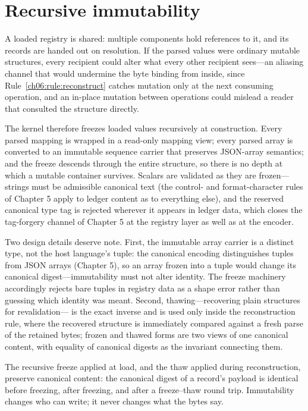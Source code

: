 \section{Recursive immutability}\label{ch06:immutability}

A loaded registry is shared: multiple components hold references to it,
and its records are handed out on resolution. If the parsed values were
ordinary mutable structures, every recipient could alter what every other
recipient sees---an aliasing channel that would undermine the byte
binding from inside, since Rule~\ref{ch06:rule:reconstruct} catches
mutation only at the next consuming operation, and an in-place mutation
between operations could mislead a reader that consulted the structure
directly.

The kernel therefore freezes loaded values recursively at construction.
Every parsed mapping is wrapped in a read-only mapping view; every parsed
array is converted to an immutable sequence carrier that preserves
JSON-array semantics; and the freeze descends through the entire
structure, so there is no depth at which a mutable container survives.
Scalars are validated as they are frozen---strings must be admissible
canonical text (the control- and format-character rules of Chapter 5
apply to ledger content as to everything else), and the reserved
canonical type tag is rejected wherever it appears in ledger data, which
closes the tag-forgery channel of Chapter 5 at the registry layer as well
as at the encoder.

Two design details deserve note. First, the immutable array carrier is a
distinct type, not the host language's tuple: the canonical encoding
distinguishes tuples from JSON arrays (Chapter 5), so an array frozen
into a tuple would change its canonical digest---immutability must not
alter identity. The freeze machinery accordingly rejects bare tuples in
registry data as a shape error rather than guessing which identity was
meant. Second, thawing---recovering plain structures for revalidation---
is the exact inverse and is used only inside the reconstruction rule,
where the recovered structure is immediately compared against a fresh
parse of the retained bytes; frozen and thawed forms are two views of one
canonical content, with equality of canonical digests as the invariant
connecting them.

\begin{invariant}\label{ch06:inv:frozen}
The recursive freeze applied at load, and the thaw applied during
reconstruction, preserve canonical content: the canonical digest of a
record's payload is identical before freezing, after freezing, and after
a freeze--thaw round trip. Immutability changes who can write; it never
changes what the bytes say.
\end{invariant}

